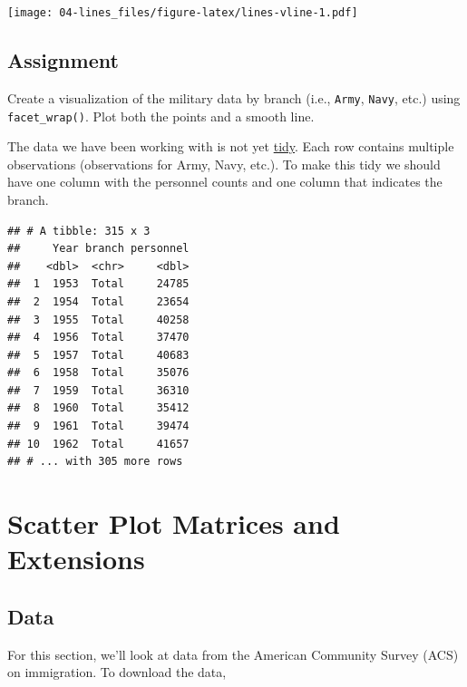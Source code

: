 \documentclass[]{book}
\newenvironment{Shaded}{\begin{snugshade}}{\end{snugshade}}
\newcommand{\KeywordTok}[1]{\textcolor[rgb]{0.13,0.29,0.53}{\textbf{{#1}}}}
\newcommand{\StringTok}[1]{\textcolor[rgb]{0.31,0.60,0.02}{{#1}}}
\newcommand{\NormalTok}[1]{{#1}}
\theoremstyle{definition}
\theoremstyle{definition}
\theoremstyle{remark}
\begin{document}
\texttt{[image: 04-lines\_files/figure-latex/lines-vline-1.pdf]}

\section{Assignment}\label{assignment-3}

Create a visualization of the military data by branch (i.e.,
\texttt{Army}, \texttt{Navy}, etc.) using \texttt{facet\_wrap()}. Plot
both the points and a smooth line.

The data we have been working with is not yet
\href{http://tidyr.tidyverse.org/}{tidy}. Each row contains multiple
observations (observations for Army, Navy, etc.). To make this tidy we
should have one column with the personnel counts and one column that
indicates the branch.

\begin{Shaded}
\end{Shaded}

\begin{verbatim}
## # A tibble: 315 x 3
##     Year branch personnel
##    <dbl>  <chr>     <dbl>
##  1  1953  Total     24785
##  2  1954  Total     23654
##  3  1955  Total     40258
##  4  1956  Total     37470
##  5  1957  Total     40683
##  6  1958  Total     35076
##  7  1959  Total     36310
##  8  1960  Total     35412
##  9  1961  Total     39474
## 10  1962  Total     41657
## # ... with 305 more rows
\end{verbatim}

\hypertarget{ggplot-exts}{\chapter{Scatter Plot Matrices and
Extensions}\label{ggplot-exts}}

\section{Data}\label{data-2}

For this section, we'll look at data from the American Community Survey
(ACS) on immigration. To download the data,
\end{document}
